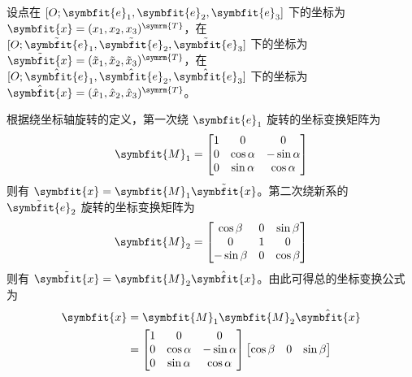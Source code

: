 \begin{solution}
    设点在 $[O; \symbfit{e}_1, \symbfit{e}_2, \symbfit{e}_3]$ 下的坐标为 $\symbfit{x} = (x_1, x_2, x_3)^{\symrm{T}}$，在 $[O; \tilde{\symbfit{e}}_1, \tilde{\symbfit{e}}_2, \tilde{\symbfit{e}}_3]$ 下的坐标为 $\tilde{\symbfit{x}} = (\tilde{x}_1, \tilde{x}_2, \tilde{x}_3)^{\symrm{T}}$，在 $[O; \hat{\symbfit{e}}_1, \hat{\symbfit{e}}_2, \hat{\symbfit{e}}_3]$ 下的坐标为 $\hat{\symbfit{x}} = (\hat{x}_1, \hat{x}_2, \hat{x}_3)^{\symrm{T}}$。

    根据绕坐标轴旋转的定义，第一次绕 $\symbfit{e}_1$ 旋转的坐标变换矩阵为
    \begin{equation*}
        \symbfit{M}_1 = \begin{bmatrix}
            1 & 0          & 0           \\
            0 & \cos\alpha & -\sin\alpha \\
            0 & \sin\alpha & \cos\alpha
        \end{bmatrix}
    \end{equation*}
    则有 $\symbfit{x} = \symbfit{M}_1 \tilde{\symbfit{x}}$。第二次绕新系的 $\tilde{\symbfit{e}}_2$ 旋转的坐标变换矩阵为
    \begin{equation*}
        \symbfit{M}_2 = \begin{bmatrix}
            \cos\beta  & 0 & \sin\beta \\
            0          & 1 & 0         \\
            -\sin\beta & 0 & \cos\beta
        \end{bmatrix}
    \end{equation*}
    则有 $\tilde{\symbfit{x}} = \symbfit{M}_2 \hat{\symbfit{x}}$。由此可得总的坐标变换公式为
    \begin{equation*}
        \begin{aligned}
            \symbfit{x} & = \symbfit{M}_1 \symbfit{M}_2 \hat{\symbfit{x}}                \\
                        & = \begin{bmatrix}
                                1 & 0          & 0           \\
                                0 & \cos\alpha & -\sin\alpha \\
                                0 & \sin\alpha & \cos\alpha
                            \end{bmatrix} \begin{bmatrix}
                                              \cos\beta  & 0 & \sin\beta \\

\end{bmatrix}
\end{aligned}
\end{equation*}
\end{solution}
